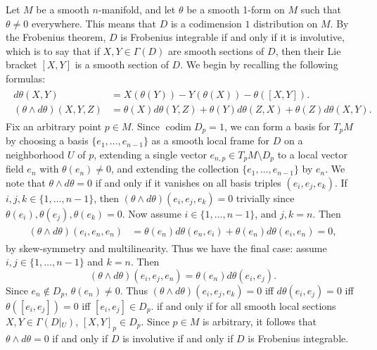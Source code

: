 \documentclass{article}
\begin{document}
	Let $M$ be a smooth $n$-manifold, and let $\theta$ be a smooth 1-form on $M$ such that $\theta \neq 0$ everywhere. This means that $D$ is a codimension $1$ distribution on $M$. By the Frobenius theorem, $D$ is Frobenius integrable if and only if it is involutive, which is to say that if $X, Y \in \Gamma(D)$ are smooth sections of $D$, then their Lie bracket $[X, Y]$ is a smooth section of $D$. We begin by recalling the following formulas: 
	\begin{align*}
		\begin{split}
			d\theta(X, Y) &= X(\theta(Y)) - Y(\theta(X)) - \theta([X, Y]). \\
			(\theta \wedge d\theta)(X, Y, Z) &= \theta(X)d\theta(Y,Z) + \theta(Y)d\theta(Z, X) + \theta(Z)d\theta(X, Y). 
		\end{split} 
	\end{align*}
	Fix an arbitrary point $p \in M$. Since $\operatorname{codim}{D_{p}} = 1$, we can form a basis for $T_{p}M$ by choosing a basis $\{e_{1}, \ldots, e_{n-1}\}$ as a smooth local frame for $D$ on a neighborhood $U$ of $p$, extending a single vector $e_{n,p} \in T_{p}M\setminus D_{p}$ to a local vector field $e_{n}$ with $\theta(e_{n}) \neq 0$, and extending the collection $\{e_{1}, \ldots, e_{n-1}\}$ by $e_{n}$. We note that $\theta \wedge d\theta = 0$ if and only if it vanishes on all basis triples $(e_{i}, e_{j}, e_{k})$. If $i, j, k \in \{1, \ldots, n - 1\}$, then $(\theta \wedge d\theta)(e_{i}, e_{j}, e_{k}) = 0$ trivially since $\theta(e_{i}), \theta(e_{j}), \theta(e_{k}) = 0$. Now assume $i \in \{1, \ldots, n - 1\}$, and $j, k = n$. Then 
	\begin{align*}
		\begin{split}
			(\theta \wedge d\theta)(e_{i}, e_{n}, e_{n}) &= \theta(e_{n})d\theta(e_{n}, e_{i}) + \theta(e_{n})d\theta(e_{i},e_{n}) = 0, 
		\end{split}
	\end{align*}
	by skew-symmetry and multilinearity. Thus we have the final case: assume $i, j \in \{1, \ldots, n -1\}$ and $k = n$. Then 
	\begin{equation*}
		(\theta \wedge d\theta)(e_{i}, e_{j}, e_{n}) = \theta(e_{n})d\theta(e_{i}, e_{j}). 
	\end{equation*}
	Since $e_{n}\notin D_{p}$, $\theta(e_{n}) \neq 0$. Thus $(\theta \wedge d\theta)(e_{i}, e_{j}, e_{k}) = 0$ iff $d\theta(e_{i}, e_{j}) = 0$ iff $\theta([e_{i}, e_{j}]) = 0$ iff $[e_{i}, e_{j}] \in D_{p}$. if and only if for all smooth local sections $X, Y \in \Gamma(D\vert{}_U)$, $[X, Y]_p \in D_p$. Since $p \in M$ is arbitrary, it follows that $\theta \wedge d\theta = 0$ if and only if $D$ is involutive if and only if $D$ is Frobenius integrable.
	
\end{document}
